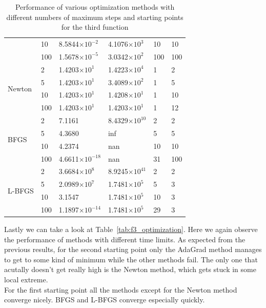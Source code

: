 \documentclass[9pt]{IEEEtran}
\begin{document}
\begin{table}[h!]
\begin{tabular}{|p{1cm}|p{1cm}|p{1.7cm}|p{1.7cm}|p{0.4cm}|p{0.4cm}|}
                                       & 10 & 8.5844$\times 10^{-2}$  & 4.1076$\times 10^{3}$   & 10 & 10 \\ \cline{2-6} 
                                       & 100 & 1.5678$\times 10^{-5}$  & 3.0342$\times 10^{2}$   & 100 & 100 \\ \hline
        \multirow{4}{*}{Newton}          & 2  & 1.4203$\times 10^{1}$  & 1.4223$\times 10^{4}$   & 1  & 2 \\ \cline{2-6} 
                                       & 5  & 1.4203$\times 10^{1}$  & 3.4089$\times 10^{2}$   & 1  & 5 \\ \cline{2-6} 
                                       & 10 & 1.4203$\times 10^{1}$  & 1.4208$\times 10^{1}$   & 1  & 10 \\ \cline{2-6} 
                                       & 100 & 1.4203$\times 10^{1}$  & 1.4203$\times 10^{1}$   & 1  & 12 \\ \hline
        \multirow{4}{*}{BFGS}            & 2  & 7.1161  & 8.4329$\times 10^{10}$  & 2  & 2 \\ \cline{2-6} 
                                       & 5  & 4.3680  & inf      & 5  & 5 \\ \cline{2-6} 
                                       & 10 & 4.2374  & nan      & 10 & 10 \\ \cline{2-6} 
                                       & 100 & 4.6611$\times 10^{-18}$  & nan      & 31 & 100 \\ \hline
        \multirow{4}{*}{L-BFGS}          & 2  & 3.6684$\times 10^{8}$  & 8.9245$\times 10^{41}$  & 2  & 2 \\ \cline{2-6} 
                                       & 5  & 2.0989$\times 10^{7}$  & 1.7481$\times 10^{5}$   & 5  & 3 \\ \cline{2-6} 
                                       & 10 & 3.1547  & 1.7481$\times 10^{5}$   & 10 & 3 \\ \cline{2-6} 
                                       & 100 & 1.1897$\times 10^{-14}$  & 1.7481$\times 10^{5}$   & 29 & 3 \\ \hline
    \end{tabular}
    \caption{Performance of various optimization methods with different numbers of maximum steps and starting points for the third 
    function}
    \label{tab:f3}
\end{table}

Lastly we can take a look at Table~\ref{tab:f3_optimization}. Here we again observe the 
performance of methods with different time limits. As expected from the previous results, for the second
starting  point only the 
AdaGrad method manages to get to some kind of minimum while the other methods fail. The only one that acutally 
doesn't get really high is the Newton method, which gets stuck in some local extreme. \\For the first starting 
point all the methods except for the Newton method converge nicely. BFGS and L-BFGS converge especially 
quickly. 
\end{document}
